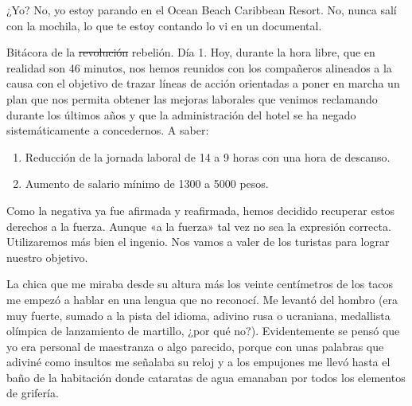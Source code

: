 \documentclass[12pt,twoside,openright,a5paper]{book}
\begin{document}
¿Yo? No, yo estoy parando en el Ocean Beach Caribbean Resort. No, nunca
salí con la mochila, lo que te estoy contando lo vi en un documental.

\vspace{0.5cm}
\afterpage{}
\hrulefill\hspace{0.2cm} \decofourleft\decofourright \hspace{0.2cm} \hrulefill
\vspace{0.5cm}

Bitácora de la \st{revolución} rebelión. Día 1. Hoy, durante la hora libre, que en
realidad son 46 minutos, nos hemos reunidos con los compañeros alineados
a la causa con el objetivo de trazar líneas de acción orientadas a poner
en marcha un plan que nos permita obtener las mejoras laborales que venimos
reclamando durante los últimos años y que la administración del hotel
se ha negado sistemáticamente a concedernos. A saber:

\begin{enumerate}
\item Reducción de la jornada laboral de 14 a 9 horas con una hora de descanso.
\item Aumento de salario mínimo de 1300 a 5000 pesos.
\end{enumerate}

Como la negativa ya fue afirmada y reafirmada, hemos decidido recuperar
estos derechos a la fuerza. Aunque «a la fuerza» tal vez no sea la expresión
correcta. Utilizaremos más bien el ingenio. Nos vamos a valer de los turistas
para lograr nuestro objetivo.

\vspace{0.5cm}

\hrulefill\hspace{0.2cm} \decofourleft\decofourright \hspace{0.2cm} \hrulefill
\vspace{0.5cm}

La chica que me miraba desde su altura más los veinte centímetros de
los tacos me empezó a hablar en una lengua que no reconocí. Me levantó
del hombro (era muy fuerte, sumado a la pista del idioma, adivino rusa o
ucraniana, medallista olímpica de lanzamiento de martillo, ¿por qué
no?). Evidentemente se pensó que yo era personal de maestranza o algo
parecido, porque con unas palabras que adiviné como insultos me señalaba
su reloj y a los empujones me llevó hasta el baño de la habitación donde
cataratas de agua emanaban por todos los elementos de grifería.
\end{document}
